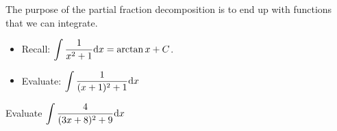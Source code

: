 \begin{frame}[t]
\AnswerSpace
{}

The purpose of the partial fraction decomposition is to end up with functions \alert{that we can integrate}. 

\pause
\begin{itemize}[<+->]
\item Recall: $\displaystyle\int\frac{1}{x^2+1}\text{d} x = \arctan x+C$. \vfill
\item Evaluate: $\displaystyle\int\frac{1}{(x+1)^2+1}\text{d} x$
\vfill
{}\vfill\vfill

\end{itemize}
\end{frame}
\begin{frame}[t]
Evaluate $\displaystyle\int\frac{4}{(3x+8)^2+9}\text{d} x$

\end{frame}

